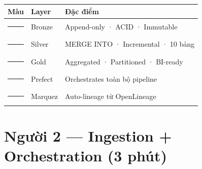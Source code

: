 \documentclass[12pt, a4paper]{article}
\begin{document}
\begin{tcolorbox}[colback=gray!5, colframe=gray!40, arc=6pt,
  title={\faSitemap\ Sơ đồ 1 — Lambda + Medallion Architecture}]
\begin{center}
\begin{tabular}{cll}
\toprule
Màu & Layer & Đặc điểm \\
\midrule
\textcolor{bronze}{\rule{12pt}{8pt}} & Bronze & Append-only · ACID · Immutable \\
\textcolor{silver}{\rule{12pt}{8pt}} & Silver & MERGE INTO · Incremental · 10 bảng \\
\textcolor{gold}{\rule{12pt}{8pt}}   & Gold   & Aggregated · Partitioned · BI-ready \\
\textcolor{blue!60}{\rule{12pt}{8pt}} & Prefect & Orchestrates toàn bộ pipeline \\
\textcolor{teal!60}{\rule{12pt}{8pt}} & Marquez & Auto-lineage từ OpenLineage \\
\bottomrule
\end{tabular}
\end{center}

\end{tcolorbox}

\newpage

\section{Người 2 — Ingestion + Orchestration (3 phút)}
\end{document}
